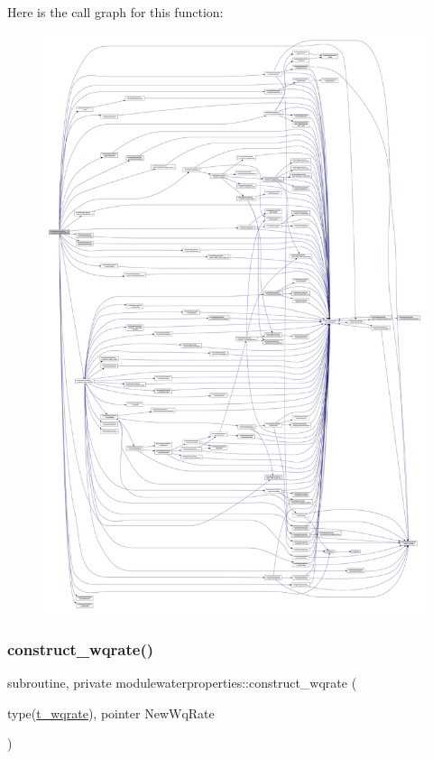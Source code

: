 Here is the call graph for this function\+:\nopagebreak
\begin{figure}[H]
\begin{center}
\leavevmode
\includegraphics[width=350pt]{namespacemodulewaterproperties_a4b5a43f1052c697cd24d266317cd9be5_cgraph}
\end{center}
\end{figure}
\mbox{\label{namespacemodulewaterproperties_a8f1edb788021e4c68656d11b8b90ea26}} 
\subsubsection{\texorpdfstring{construct\+\_\+wqrate()}{construct\_wqrate()}}
{\footnotesize\ttfamily subroutine, private modulewaterproperties\+::construct\+\_\+wqrate (\begin{DoxyParamCaption}\item[{type(\mbox{\hyperlink{structmodulewaterproperties_1_1t__wqrate}{t\+\_\+wqrate}}), pointer}]{New\+Wq\+Rate }\end{DoxyParamCaption})\hspace{0.3cm}{\ttfamily [private]}}

